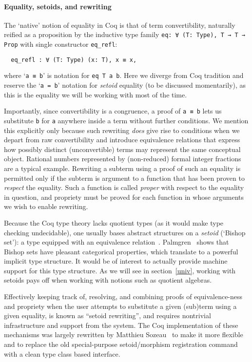 \documentclass[a4paper,10pt,runningheads]{llncs}
\begin{document}
\paragraph{Equality, setoids, and rewriting}

The `native' notion of equality in Coq is that of term convertibility, naturally reified as a proposition by the inductive type family \lstinline|eq: ∀ (T: Type), T → T → Prop| with single constructor \lstinline|eq_refl|:
\begin{lstlisting}
  eq_refl : ∀ (T: Type) (x: T), x ≡ x,
\end{lstlisting}
where `\lstinline|a ≡ b|' is notation for \lstinline|eq T a b|. Here we diverge from Coq tradition and reserve the `\lstinline|a = b|' notation for \emph{setoid} equality (to be discussed momentarily), as this is the equality we will be working with most of the time.

Importantly, since convertibility is a congruence, a proof of \lstinline|a ≡ b| lets us substitute \lstinline|b| for \lstinline|a| anywhere inside a term without further conditions. We mention this explicitly only because such rewriting \emph{does} give rise to conditions when we depart from raw convertibility and introduce equivalence relations that express how possibly distinct (unconvertible) terms may represent the same conceptual object. Rational numbers represented by (non-reduced) formal integer fractions are a typical example. Rewriting a subterm using a proof of such an equality is permitted only if the subterm is argument to a function that has been proven to \emph{respect} the equality. Such a function is called \emph{proper} with respect to the equality in question, and propriety must be proved for each function in whose arguments we wish to enable rewriting.

Because the Coq type theory lacks quotient types (as it would make type checking undecidable), one usually bases abstract structures on a \emph{setoid} (`Bishop set'): a type equipped with an equivalence relation~\cite{Bishop67,Hofmann,Capretta}. Palmgren~\cite{palmgren2009constructivist} shows that Bishop sets have pleasant categorical properties, which translate to a powerful implicit type structure. It would be of interest to actually provide machine support for this type structure. As we will see in section~\ref{univ}, working with setoids pays off when working with notions such as quotient algebras.

Effectively keeping track of, resolving, and combining proofs of equivalence-ness and propriety when the user attempts to substitute a given (sub)term using a given equality, is known as ``setoid rewriting'', and requires nontrivial infrastructure and support from the system. The Coq implementation of these mechanisms was largely rewritten by Matthieu Sozeau~\cite{Setoid-rewrite} to make it more flexible and to replace the old special-purpose setoid/morphism registration command with a clean type class based interface.
\end{document}
